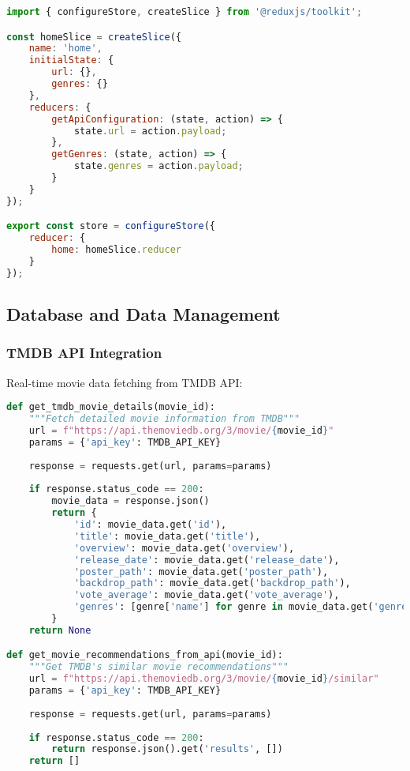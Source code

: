 \documentclass[12pt,a4paper]{article}
\begin{document}
\begin{lstlisting}[language=JavaScript, caption=Redux Store Configuration]
import { configureStore, createSlice } from '@reduxjs/toolkit';

const homeSlice = createSlice({
    name: 'home',
    initialState: {
        url: {},
        genres: {}
    },
    reducers: {
        getApiConfiguration: (state, action) => {
            state.url = action.payload;
        },
        getGenres: (state, action) => {
            state.genres = action.payload;
        }
    }
});

export const store = configureStore({
    reducer: {
        home: homeSlice.reducer
    }
});
\end{lstlisting}

\subsection{Database and Data Management}

\subsubsection{TMDB API Integration}
Real-time movie data fetching from TMDB API:

\begin{lstlisting}[language=Python, caption=TMDB API Integration]
def get_tmdb_movie_details(movie_id):
    """Fetch detailed movie information from TMDB"""
    url = f"https://api.themoviedb.org/3/movie/{movie_id}"
    params = {'api_key': TMDB_API_KEY}
    
    response = requests.get(url, params=params)
    
    if response.status_code == 200:
        movie_data = response.json()
        return {
            'id': movie_data.get('id'),
            'title': movie_data.get('title'),
            'overview': movie_data.get('overview'),
            'release_date': movie_data.get('release_date'),
            'poster_path': movie_data.get('poster_path'),
            'backdrop_path': movie_data.get('backdrop_path'),
            'vote_average': movie_data.get('vote_average'),
            'genres': [genre['name'] for genre in movie_data.get('genres', [])]
        }
    return None

def get_movie_recommendations_from_api(movie_id):
    """Get TMDB's similar movie recommendations"""
    url = f"https://api.themoviedb.org/3/movie/{movie_id}/similar"
    params = {'api_key': TMDB_API_KEY}
    
    response = requests.get(url, params=params)
    
    if response.status_code == 200:
        return response.json().get('results', [])
    return []
\end{lstlisting}
\end{document}
